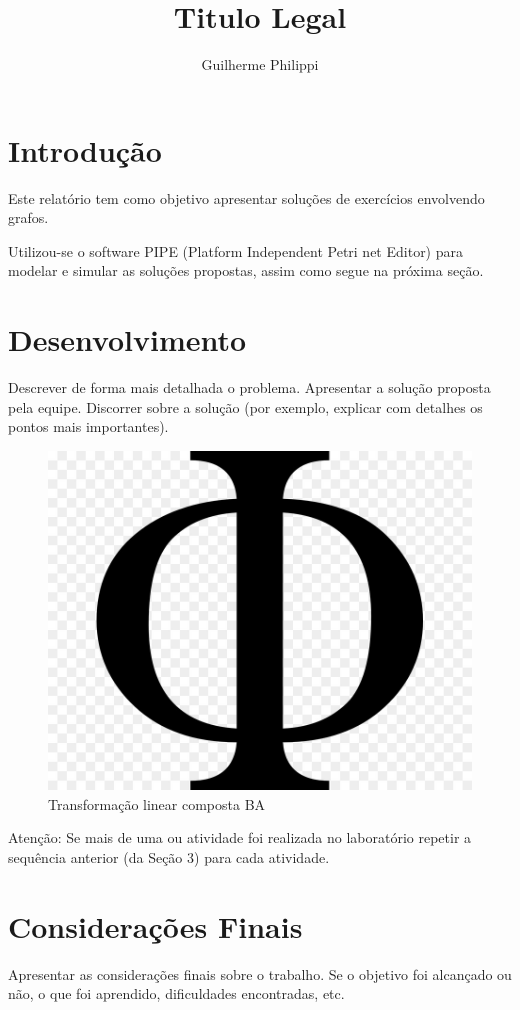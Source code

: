 \documentclass[a4paper,12pt]{article}
\title{Titulo Legal}
\author{Guilherme Philippi}
\begin{document}
\maketitle
\tableofcontents

\section{Introdução}

Este relatório tem como objetivo apresentar soluções de exercícios envolvendo grafos.

Utilizou-se o software PIPE (Platform Independent Petri net Editor) \cite{dias2007ferramentas} para modelar e simular as soluções propostas, assim como segue na próxima seção.

\section{Desenvolvimento}
Descrever de forma mais detalhada o problema.
Apresentar a solução proposta pela equipe.
Discorrer sobre a solução (por exemplo, explicar com detalhes os pontos mais
importantes).

\begin{figure}[H]
	\begin{center}
		\includegraphics[width=0.4\linewidth]{img.png}
	\end{center}
	\caption{Transformação linear composta BA}
	\label{fig:compfunc}
\end{figure}

Atenção: Se mais de uma ou atividade foi realizada no laboratório repetir a sequência
anterior (da Seção 3) para cada atividade.

\section{Considerações Finais}
Apresentar as considerações finais sobre o trabalho. Se o objetivo foi alcançado ou não,
o que foi aprendido, dificuldades encontradas, etc.

{}



\end{document}
